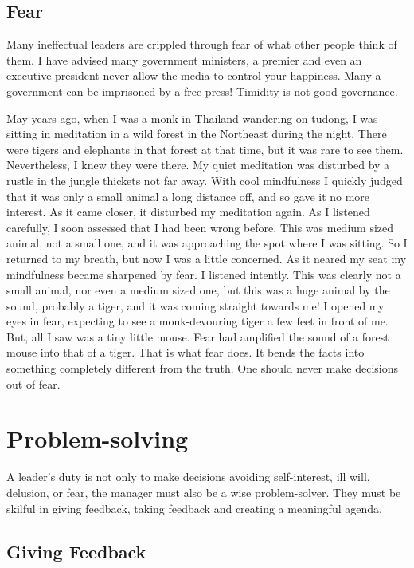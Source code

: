 \documentclass[11pt, openany]{book}
\begin{document}
\section{Fear}

Many ineffectual leaders are crippled through fear of what other people think of them. I have advised many government ministers, a premier and even an executive president never allow the media to control your happiness. Many a government can be imprisoned by a free press! Timidity is not good governance.

May years ago, when I was a monk in Thailand wandering on tudong, I was sitting in meditation in a wild forest in the Northeast during the night. There were tigers and elephants in that forest at that time, but it was rare to see them. Nevertheless, I knew they were there. My quiet meditation was disturbed by a rustle in the jungle thickets not far away. With cool mindfulness I quickly judged that it was only a small animal a long distance off, and so gave it no more interest. As it came closer, it disturbed my meditation again. As I listened carefully, I soon assessed that I had been wrong before. This was medium sized animal, not a small one, and it was approaching the spot where I was sitting. So I returned to my breath, but now I was a little concerned. As it neared my seat my mindfulness became sharpened by fear. I listened intently. This was clearly not a small animal, nor even a medium sized one, but this was a huge animal by the sound, probably a tiger, and it was coming straight towards me! I opened my eyes in fear, expecting to see a monk-devouring tiger a few feet in front of me. But, all I saw was a tiny little mouse. Fear had amplified the sound of a forest mouse into that of a tiger. That is what fear does. It bends the facts into something completely different from the truth. One should never make decisions out of fear.

\chapter{Problem-solving}

A leader’s duty is not only to make decisions avoiding self-interest, ill will, delusion, or fear, the manager must also be a wise problem-solver. They must be skilful in giving feedback, taking feedback and creating a meaningful agenda.


\section{Giving Feedback}
\end{document}
